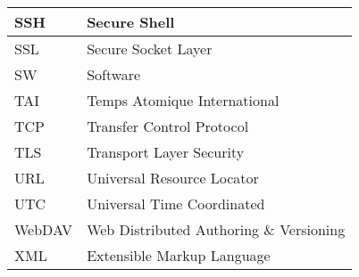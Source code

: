 \documentclass[dec_sum_main.tex]{subfiles}
\begin{document}
\begin{longtable}{|m{2.8cm}|m{10cm}|}
	SSH & Secure Shell \\ \hline
	SSL & Secure Socket Layer \\ \hline
	SW & Software \\ \hline
	TAI & Temps Atomique International \\ \hline
	TCP & Transfer Control Protocol \\ \hline
	TLS & Transport Layer Security \\ \hline
	URL & Universal Resource Locator \\ \hline
	UTC & Universal Time Coordinated \\ \hline
	WebDAV & Web Distributed Authoring \& Versioning \\ \hline
	XML & Extensible Markup Language \\ \hline						
\end{longtable}
\end{document}
